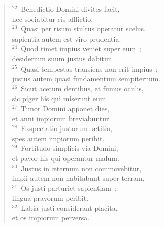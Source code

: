 \begin{flushleft}\begin{verse}${}^{22}$~Benedictio Domini divites facit,\\ nec sociabitur eis afflictio.\\
${}^{23}$~Quasi per risum stultus operatur scelus,\\ sapientia autem est viro prudentia.\\
${}^{24}$~Quod timet impius veniet super eum~;\\ desiderium suum justus dabitur.\\
${}^{25}$~Quasi tempestas transiens non erit impius~;\\ justus autem quasi fundamentum sempiternum.\\
${}^{26}$~Sicut acetum dentibus, et fumus oculis,\\ sic piger his qui miserunt eum.\\
${}^{27}$~Timor Domini apponet dies,\\ et anni impiorum breviabuntur.\\
${}^{28}$~Exspectatio justorum l\ae titia,\\ spes autem impiorum peribit.\\
${}^{29}$~Fortitudo simplicis via Domini,\\ et pavor his qui operantur malum.\\
${}^{30}$~Justus in \ae ternum non commovebitur,\\ impii autem non habitabunt super terram.\\
${}^{31}$~Os justi parturiet sapientiam~;\\ lingua pravorum peribit.\\
${}^{32}$~Labia justi considerant placita,\\ et os impiorum perversa.\end{verse}\end{flushleft}


